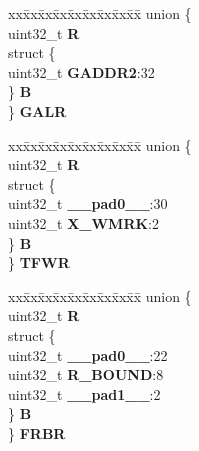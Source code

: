 \begin{DoxyCompactItemize}
\begin{tabbing}
\end{tabbing}\item 
\mbox{\label{structFEC__tag_aa06af527f6be4b976822d1584840ad04}} 
\begin{tabbing}
xx\=xx\=xx\=xx\=xx\=xx\=xx\=xx\=xx\=\kill
union \{\\
\>uint32\_t {\bfseries R}\\
\>struct \{\\
\>\>uint32\_t {\bfseries GADDR2}:32\\
\>\} {\bfseries B}\\
\} {\bfseries GALR}\\

\end{tabbing}\item 
\mbox{\label{structFEC__tag_a7982b8e74fee1cce032b2d0bcb190fd7}} 
\begin{tabbing}
xx\=xx\=xx\=xx\=xx\=xx\=xx\=xx\=xx\=\kill
union \{\\
\>uint32\_t {\bfseries R}\\
\>struct \{\\
\>\>uint32\_t {\bfseries \_\_pad0\_\_}:30\\
\>\>uint32\_t {\bfseries X\_WMRK}:2\\
\>\} {\bfseries B}\\
\} {\bfseries TFWR}\\

\end{tabbing}\item 
\mbox{\label{structFEC__tag_a188fbfa2084582919420080ecd83ccad}} 
\begin{tabbing}
xx\=xx\=xx\=xx\=xx\=xx\=xx\=xx\=xx\=\kill
union \{\\
\>uint32\_t {\bfseries R}\\
\>struct \{\\
\>\>uint32\_t {\bfseries \_\_pad0\_\_}:22\\
\>\>uint32\_t {\bfseries R\_BOUND}:8\\
\>\>uint32\_t {\bfseries \_\_pad1\_\_}:2\\
\>\} {\bfseries B}\\
\} {\bfseries FRBR}\\


\end{tabbing}
\end{DoxyCompactItemize}
